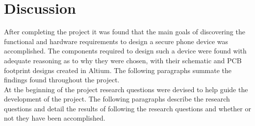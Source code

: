 
\chapter{Discussion} %

\label{Chapter7} %


	After completing the project it was found that the main goals of discovering the functional and hardware requirements to design a secure phone device was accomplished. The components required to design such a device were found with adequate reasoning as to why they were chosen, with their schematic and PCB footprint designs created in Altium. The following paragraphs summate the findings found throughout the project.\\

	At the beginning of the project research questions were devised to help guide the development of the project. The following paragraphs describe the research questions and detail the results of following the research questions and whether or not they have been accomplished.\\

